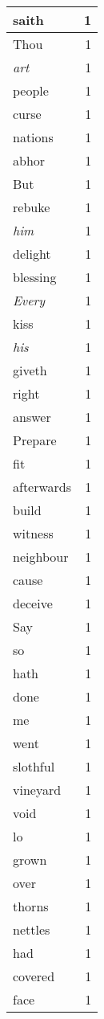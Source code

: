 \begin{center}
\begin{longtable}{l|r}
saith & 1\\ \hline 
Thou & 1\\ \hline 
\emph{art} & 1\\ \hline 
people & 1\\ \hline 
curse & 1\\ \hline 
nations & 1\\ \hline 
abhor & 1\\ \hline 
But & 1\\ \hline 
rebuke & 1\\ \hline 
\emph{him} & 1\\ \hline 
delight & 1\\ \hline 
blessing & 1\\ \hline 
\emph{Every} & 1\\ \hline 
kiss & 1\\ \hline 
\emph{his} & 1\\ \hline 
giveth & 1\\ \hline 
right & 1\\ \hline 
answer & 1\\ \hline 
Prepare & 1\\ \hline 
fit & 1\\ \hline 
afterwards & 1\\ \hline 
build & 1\\ \hline 
witness & 1\\ \hline 
neighbour & 1\\ \hline 
cause & 1\\ \hline 
deceive & 1\\ \hline 
Say & 1\\ \hline 
so & 1\\ \hline 
hath & 1\\ \hline 
done & 1\\ \hline 
me & 1\\ \hline 
went & 1\\ \hline 
slothful & 1\\ \hline 
vineyard & 1\\ \hline 
void & 1\\ \hline 
lo & 1\\ \hline 
grown & 1\\ \hline 
over & 1\\ \hline 
thorns & 1\\ \hline 
nettles & 1\\ \hline 
had & 1\\ \hline 
covered & 1\\ \hline 
face & 1\\ \hline 

\end{longtable}
\end{center}
